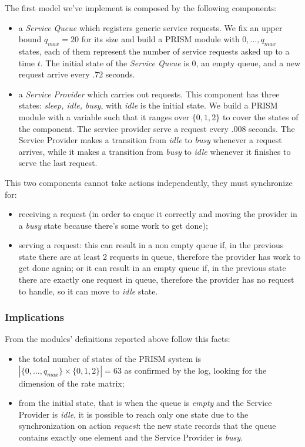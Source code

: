 The first model we've implement is composed by the following
components:
\begin{itemize}
\item a \emph{Service Queue} which registers generic service
  requests. We fix an upper bound $q_{max} = 20$ for its size and
  build a PRISM module with $0,\ldots,q_{max}$ states, each of them
  represent the number of service requests asked up to a time $t$. The
  initial state of the \emph{Service Queue} is $0$, an empty queue,
  and a new request arrive every $.72$ seconds.
\item a \emph{Service Provider} which carries out requests. This
  component has three states: \emph{sleep, idle, busy}, with
  \emph{idle} is the initial state. We build a PRISM module with a
  variable such that it ranges over $\{0,1,2\}$ to cover the states of
  the component. The service provider serve a request every $.008$
  seconds. The Service Provider makes a transition from \emph{idle} to
  \emph{busy} whenever a request arrives, while it makes a transition
  from \emph{busy} to \emph{idle} whenever it finishes to serve the
  last request.
\end{itemize}
This two components cannot take actions independently, they must
synchronize for:
\begin{itemize}
\item receiving a request (in order to enque it correctly and moving
  the provider in a \emph{busy} state because there's some work to get
  done);
\item serving a request: this can result in a non empty queue if, in
  the previous state there are at least 2 requests in queue, therefore
  the provider has work to get done again; or it can result in an
  empty queue if, in the previous state there are exactly one request
  in queue, therefore the provider has no request to handle, so it can
  move to \emph{idle} state.
\end{itemize}

\subsubsection{Implications}

From the modules' definitions reported above follow this facts:
\begin{itemize}
\item the total number of states of the PRISM system is
  $|\{0,\ldots,q_{max}\} \times \{0,1,2\}| = 63$ as confirmed by the
  log, looking for the dimension of the rate matrix;
\item from the initial state, that is when the queue is \emph{empty}
  and the Service Provider is \emph{idle}, it is possible to reach
  only one state due to the synchronization on action \emph{request}:
  the new state records that the queue contains exactly one element
  and the Service Provider is \emph{busy}.
\end{itemize}

